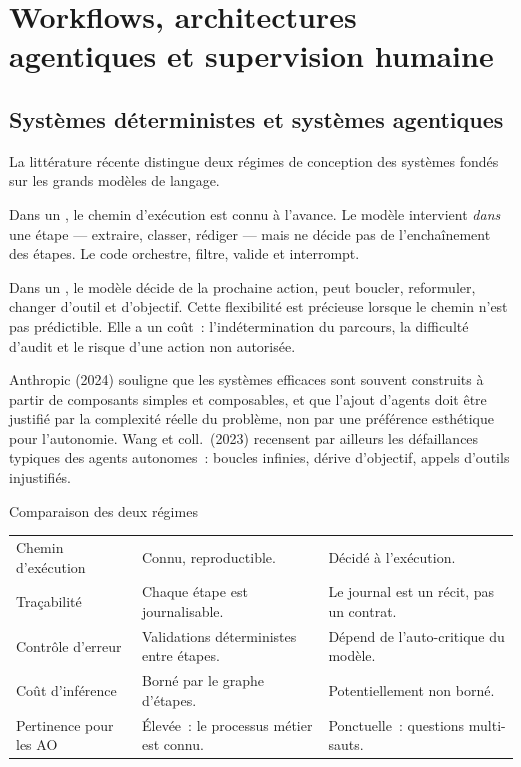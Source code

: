 \section{Workflows, architectures agentiques et supervision humaine}
\label{sec:ch1-workflows}

\subsection{Systèmes déterministes et systèmes agentiques}

La littérature récente distingue deux régimes de conception des systèmes
fondés sur les grands modèles de langage.

Dans un , le chemin d'exécution est connu à
l'avance. Le modèle intervient \emph{dans} une étape --- extraire, classer,
rédiger --- mais ne décide pas de l'enchaînement des étapes. Le code
orchestre, filtre, valide et interrompt.

Dans un , le modèle décide de la prochaine
action, peut boucler, reformuler, changer d'outil et d'objectif. Cette
flexibilité est précieuse lorsque le chemin n'est pas prédictible. Elle a
un coût~: l'indétermination du parcours, la difficulté d'audit et le risque
d'une action non autorisée.

Anthropic (2024) souligne que les systèmes efficaces sont souvent construits
à partir de composants simples et composables, et que l'ajout d'agents doit
être justifié par la complexité réelle du problème, non par une préférence
esthétique pour l'autonomie. Wang et coll.\ (2023) recensent par ailleurs
les défaillances typiques des agents autonomes~: boucles infinies, dérive
d'objectif, appels d'outils injustifiés.

\begin{btptable}{Comparaison des deux régimes}
\label{tab:workflow-vs-agent}
\begin{tabularx}{\linewidth}{@{}L{3.6cm} Y Y@{}}
\toprule
{}
 &  &  \\
\midrule
Chemin d'exécution & Connu, reproductible. & Décidé à l'exécution. \\
Traçabilité & Chaque étape est journalisable. & Le journal est un récit, pas un contrat. \\
Contrôle d'erreur & Validations déterministes entre étapes. & Dépend de l'auto-critique du modèle. \\
Coût d'inférence & Borné par le graphe d'étapes. & Potentiellement non borné. \\
Pertinence pour les AO & Élevée~: le processus métier est connu. & Ponctuelle~: questions multi-sauts. \\
\bottomrule
\end{tabularx}
\end{btptable}


